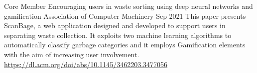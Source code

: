 


\begin{cventries}


\cventry
{Core Member} %
{Encouraging users in waste sorting using deep neural networks and gamification} %
{Association of Computer Machinery} %
{Sep 2021} %
{ %
This paper presents ScanBage, a web application designed and developed to support users in separating waste collection. It exploits two machine learning algorithms to automatically classify garbage categories and it employs Gamification elements with the aim of increasing user involvement.
\href{https://dl.acm.org/doi/abs/10.1145/3462203.3477056}{https://dl.acm.org/doi/abs/10.1145/3462203.3477056}
}

\end{cventries}